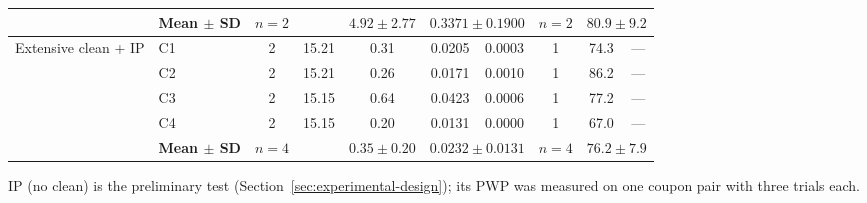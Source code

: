 \begin{table}[htbp]
{\begin{tabular}{llcccccccc}
    & \textbf{Mean $\pm$ SD} & $n=2$ & & $\boldsymbol{4.92 \pm 2.77}$ & \multicolumn{2}{c}{$\boldsymbol{0.3371 \pm 0.1900}$} & $n=2$ & \multicolumn{2}{c}{$\boldsymbol{80.9 \pm 9.2}$} \\
    \midrule
    Extensive clean + IP & C1 & 2 & 15.21 & 0.31 & 0.0205 & 0.0003 & 1 & 74.3 & --- \\
     & C2 & 2 & 15.21 & 0.26 & 0.0171 & 0.0010 & 1 & 86.2 & --- \\
     & C3 & 2 & 15.15 & 0.64 & 0.0423 & 0.0006 & 1 & 77.2 & --- \\
     & C4 & 2 & 15.15 & 0.20 & 0.0131 & 0.0000 & 1 & 67.0 & --- \\
    \addlinespace[1pt]
    & \textbf{Mean $\pm$ SD} & $n=4$ & & $\boldsymbol{0.35 \pm 0.20}$ & \multicolumn{2}{c}{$\boldsymbol{0.0232 \pm 0.0131}$} & $n=4$ & \multicolumn{2}{c}{$\boldsymbol{76.2 \pm 7.9}$} \\
    \bottomrule
  \end{tabular}}
  \par\smallskip
  \parbox{\linewidth}{\footnotesize IP (no clean) is the preliminary test (Section~\ref{sec:experimental-design}); its PWP was measured on one coupon pair with three trials each.}
\end{table}


